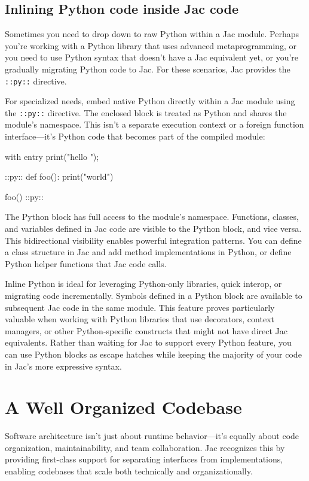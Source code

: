 \subsection{Inlining Python code inside Jac code}

Sometimes you need to drop down to raw Python within a Jac module. Perhaps you're working with a Python library that uses advanced metaprogramming, or you need to use Python syntax that doesn't have a Jac equivalent yet, or you're gradually migrating Python code to Jac. For these scenarios, Jac provides the \texttt{::py::} directive.

For specialized needs, embed native Python directly within a Jac module using the \texttt{::py::} directive. The enclosed block is treated as Python and shares the module's namespace. This isn't a separate execution context or a foreign function interface—it's Python code that becomes part of the compiled module:

\begin{jacblock}
with entry {
    print("hello ");
}

::py::
def foo():
    print("world")

foo()
::py::
\end{jacblock}

The Python block has full access to the module's namespace. Functions, classes, and variables defined in Jac code are visible to the Python block, and vice versa. This bidirectional visibility enables powerful integration patterns. You can define a class structure in Jac and add method implementations in Python, or define Python helper functions that Jac code calls.

Inline Python is ideal for leveraging Python-only libraries, quick interop, or migrating code incrementally. Symbols defined in a Python block are available to subsequent Jac code in the same module. This feature proves particularly valuable when working with Python libraries that use decorators, context managers, or other Python-specific constructs that might not have direct Jac equivalents. Rather than waiting for Jac to support every Python feature, you can use Python blocks as escape hatches while keeping the majority of your code in Jac's more expressive syntax.

\section{A Well Organized Codebase}

Software architecture isn't just about runtime behavior—it's equally about code organization, maintainability, and team collaboration. Jac recognizes this by providing first-class support for separating interfaces from implementations, enabling codebases that scale both technically and organizationally.

